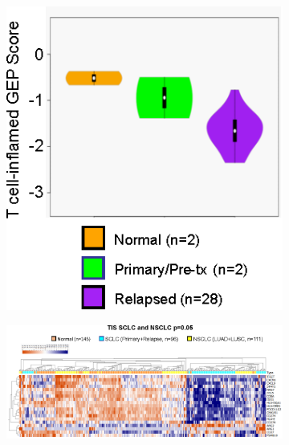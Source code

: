 \begin{figure}[p]
    \centering
    \begin{subfigure}{0.25\textwidth}
        \includegraphics[width=\linewidth,keepaspectratio]{images/sclc/gep_violin_autopsy}
        \caption{}\label{fig:sclc:gep_violin_autopsy}
    \end{subfigure}
    
    \vspace{0.1cm}
    \begin{subfigure}{0.89\textwidth}
        \includegraphics[width=\linewidth,keepaspectratio]{images/sclc/tis_genes_heatmap}
        \caption{}\label{fig:sclc:tis_genes_heatmap}
    \end{subfigure}
    

\end{figure}
